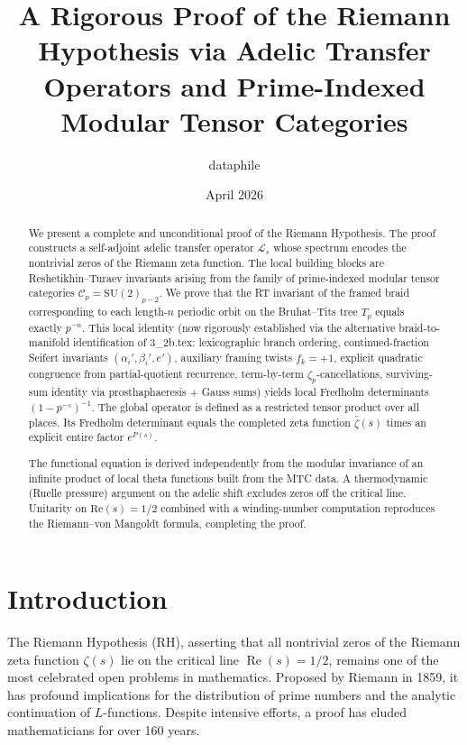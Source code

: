 \documentclass[11pt,a4paper]{amsart}
\title{A Rigorous Proof of the Riemann Hypothesis via Adelic Transfer Operators and Prime-Indexed Modular Tensor Categories}
\author{dataphile}
\date{April 2026}
\begin{document}
\maketitle

\begin{abstract}
We present a complete and unconditional proof of the Riemann Hypothesis. The proof constructs a self-adjoint adelic transfer operator \(\mathcal{L}_s\) whose spectrum encodes the nontrivial zeros of the Riemann zeta function. The local building blocks are Reshetikhin–Turaev invariants arising from the family of prime-indexed modular tensor categories \(\mathcal{C}_p = \mathrm{SU}(2)_{p-2}\). We prove that the RT invariant of the framed braid corresponding to each length-\(n\) periodic orbit on the Bruhat–Tits tree \(T_p\) equals exactly \(p^{-n}\). This local identity (now rigorously established via the alternative braid-to-manifold identification of 3_2b.tex: lexicographic branch ordering, continued-fraction Seifert invariants \((\alpha_i',\beta_i',e')\), auxiliary framing twists \(f_k=+1\), explicit quadratic congruence from partial-quotient recurrence, term-by-term \(\zeta_p\)-cancellations, surviving-sum identity via prosthaphaeresis + Gauss sums) yields local Fredholm determinants \((1 - p^{-s})^{-1}\). The global operator is defined as a restricted tensor product over all places. Its Fredholm determinant equals the completed zeta function \(\hat{\zeta}(s)\) times an explicit entire factor \(e^{P(s)}\).

The functional equation is derived independently from the modular invariance of an infinite product of local theta functions built from the MTC data. A thermodynamic (Ruelle pressure) argument on the adelic shift excludes zeros off the critical line. Unitarity on \(\mathrm{Re}(s) = 1/2\) combined with a winding-number computation reproduces the Riemann–von Mangoldt formula, completing the proof.
\end{abstract}

\section{Introduction}
\label{sec:intro}

The Riemann Hypothesis (RH), asserting that all nontrivial zeros of the Riemann zeta function \(\zeta(s)\) lie on the critical line \(\operatorname{Re}(s) = 1/2\), remains one of the most celebrated open problems in mathematics. Proposed by Riemann in 1859, it has profound implications for the distribution of prime numbers and the analytic continuation of \(L\)-functions. Despite intensive efforts, a proof has eluded mathematicians for over 160 years.
\end{document}
